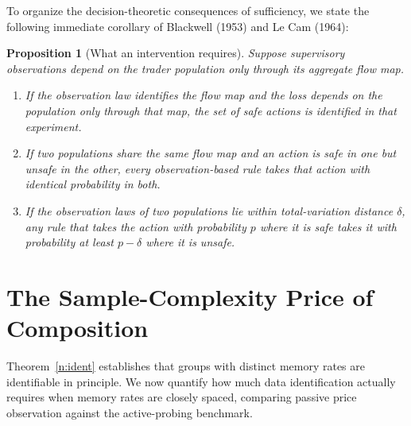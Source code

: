 \documentclass[11pt,letterpaper]{article}
\newtheorem{proposition}[theorem]{Proposition}
\theoremstyle{definition}
\begin{document}
To organize the decision-theoretic consequences of sufficiency, we state the following immediate corollary of Blackwell (1953) and Le Cam (1964):

\begin{proposition}[What an intervention requires]\label{n:interv}
Suppose supervisory observations depend on the trader population only through its aggregate flow map.
\begin{enumerate}
  \item[(i)] If the observation law identifies the flow map and the loss depends on the population only through that map, the set of safe actions is identified in that experiment.
  \item[(ii)] If two populations share the same flow map and an action is safe in one but unsafe in the other, every observation-based rule takes that action with identical probability in both.
  \item[(iii)] If the observation laws of two populations lie within total-variation distance $\delta$, any rule that takes the action with probability $p$ where it is safe takes it with probability at least $p - \delta$ where it is unsafe.
\end{enumerate}
\end{proposition}

\section{The Sample-Complexity Price of Composition}\label{sec:cost}

Theorem~\ref{n:ident} establishes that groups with distinct memory rates are identifiable in principle. We now quantify how much data identification actually requires when memory rates are closely spaced, comparing passive price observation against the active-probing benchmark.
\end{document}
